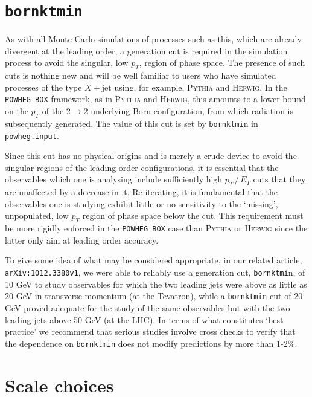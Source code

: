 \documentclass[paper]{JHEP3}
\newcommand\POWHEGBOX{{\tt POWHEG BOX}}
\begin{document}
\section{\texttt{bornktmin}}

As with all Monte Carlo simulations of processes such as this, which
are already divergent at the leading order, a generation cut
is required in the simulation process to avoid the singular, low $p_{T}$,
region of phase space. The presence of such cuts is nothing new and
will be well familiar to users who have simulated processes of the
type $X+\mathrm{jet}$ using, for example, \textsc{Pythia }and\textsc{
Herwig}. In the \POWHEGBOX{} framework, as in \textsc{Pythia
}and\textsc{ Herwig}, this amounts to a lower bound on the $p_{T}$
of the $2\rightarrow2$ underlying Born configuration, from which
radiation is subsequently generated. The value of this cut is set
by \texttt{bornktmi}n in \texttt{powheg.input}.

Since this cut has no physical origins and is merely a crude device
to avoid the singular regions of the leading order configurations,
it is essential that the observables which one is analysing include
sufficiently high $p_{T}\,/\, E_{T}$ cuts that they are unaffected
by a decrease in it. Re-iterating, it is fundamental that the observables
one is studying exhibit little or no sensitivity to the `missing',
unpopulated, low $p_{T}$ region of phase space below the cut. This
requirement must be more rigidly enforced in the \POWHEGBOX{}
case than \textsc{Pythia }or\textsc{ Herwig} since the latter only
aim at leading order accuracy.

To give some idea of what may be considered appropriate, in our related
article,\texttt{ arXiv:1012.3380v1}, we were able to reliably use
a generation cut, \texttt{bornktmi}n, of 10 GeV to study observables
for which the two leading jets were above as little as 20 GeV in transverse
momentum (at the Tevatron), while a \texttt{bornktmi}n cut of 20 GeV
proved adequate for the study of the same observables but with the
two leading jets above 50 GeV (at the LHC). In terms of what constitutes
`best practice' we recommend that serious studies involve cross checks
to verify that the dependence on \texttt{bornktmin} does not modify
predictions by more than 1-2\%.


\section{Scale choices}
\end{document}
